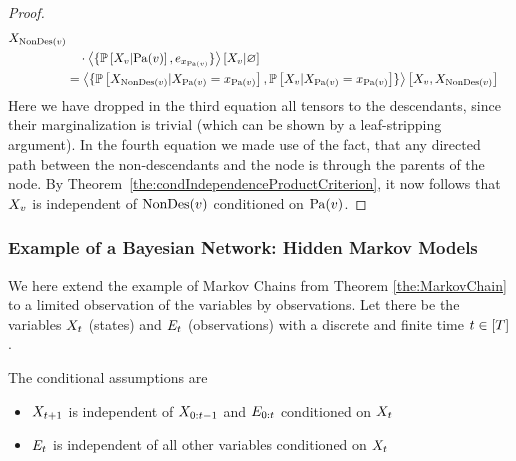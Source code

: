 \begin{proof}
\begin{align*}
{		}
		{X_{\mathrm{NonDes}(v)}} \\
		& \quad  \cdot \left\langle 
			\{\mathbb{P}\left[X_{v}|\mathrm{Pa}(v)\right],e_{x_{\mathrm{Pa}(v)}}\}
		\right\rangle \left[ X_{v} | \varnothing \right] \\
		& = \left\langle \{
		\mathbb{P}\left[X_{\mathrm{NonDes}(v)}|X_{\mathrm{Pa}(v)}=x_{\mathrm{Pa}(v)}\right],
		\mathbb{P}\left[X_{v}|X_{\mathrm{Pa}(v)}=x_{\mathrm{Pa}(v)}\right]
		\}\right\rangle \left[ X_{v},X_{\mathrm{NonDes}(v)} \right]
	\end{align*}
	Here we have dropped in the third equation all tensors to the descendants, since their marginalization is trivial (which can be shown by a leaf-stripping argument).
	In the fourth equation we made use of the fact, that any directed path between the non-descendants and the node is through the parents of the node.
	By Theorem~\ref{the:condIndependenceProductCriterion}, it now follows that $X_{v}$ is independent of $\mathrm{NonDes}(v)$ conditioned on $\mathrm{Pa}(v)$.
\end{proof}



\subsubsection{Example of a Bayesian Network: Hidden Markov Models}

We here extend the example of Markov Chains from Theorem \ref{the:MarkovChain} to a limited observation of the variables by observations.
Let there be the variables $X_{t}$ (states) and $E_{t}$ (observations) with a discrete and finite time $t\in[T]$.

The conditional assumptions are 
\begin{itemize}
	\item $X_{t+1}$ is independent of $X_{0:t-1}$ and $E_{0:t}$ conditioned on $X_{t}$
	\item $E_{t}$ is independent of all other variables conditioned on $X_{t}$
\end{itemize}

